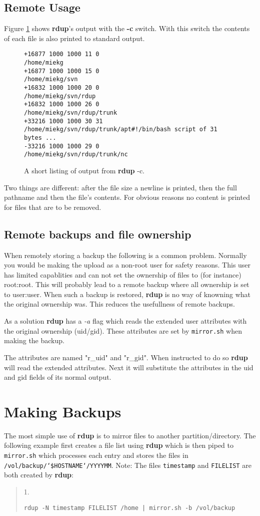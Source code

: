 \documentclass[a4paper, openany]{memoir}
\newcommand{\rdup}{\textbf{rdup}}
\newcommand{\cmd}[1]{\texttt{#1}}
\newcommand{\flag}[1]{\textit{#1}}
\begin{document}
\section{Remote Usage}
Figure \ref{fig:rdup -c output} shows \rdup's output with the
\textbf{-c} switch. With this switch the contents of each file is also
printed to standard output.

\begin{figure}[hbt]
\begin{verbatim}
+16877 1000 1000 11 0 
/home/miekg
+16877 1000 1000 15 0 
/home/miekg/svn
+16832 1000 1000 20 0 
/home/miekg/svn/rdup
+16832 1000 1000 26 0 
/home/miekg/svn/rdup/trunk
+33216 1000 1000 30 31 
/home/miekg/svn/rdup/trunk/apt#!/bin/bash script of 31 bytes ...
-33216 1000 1000 29 0 
/home/miekg/svn/rdup/trunk/nc
\end{verbatim}
\caption{A short listing of output from \rdup{} -c.}
\label{fig:rdup -c output}
\end{figure}

Two things are different: after the file size a newline is printed, then
the full pathname and then the file's contents.  For obvious reasons no
content is printed for files that are to be removed.

\section{Remote backups and file ownership}
When remotely storing a backup the following is a common problem.
Normally you would be making the upload as a non-root user for safety
reasons. This user has limited capablities and can not set the ownership
of files to (for instance) root:root. This will probably lead to a
remote backup where all ownership is set to user:user. When such a
backup is restored, \rdup{} is no way of knowning what the original
ownership was. This reduces the usefullness of remote backups.

As a solution \rdup{} has a \flag{-a} flag which reads the
extended user attributes with the original ownership (uid/gid).
These attributes are set by \cmd{mirror.sh} when making the backup.

The attributes are named "r\_uid" and "r\_gid". When instructed to
do so \rdup{} will read the extended attributes. Next it will 
substitute the attributes in the uid and gid fields of its
normal output.

\chapter{Making Backups}
The most simple use of \rdup{} is to mirror files to
another partition/directory. The following example first
creates a file list using \rdup{} which is then piped to 
\cmd{mirror.sh} which processes each entry and stores the
files in 
\texttt{/vol/backup/`\$HOSTNAME`/YYYYMM}.
Note: The files \cmd{timestamp} and \cmd{FILELIST} are
both created by \rdup:
\begin{quote}
1.
\begin{verbatim}
rdup -N timestamp FILELIST /home | mirror.sh -b /vol/backup
\end{verbatim}
\end{quote}
\end{document}
